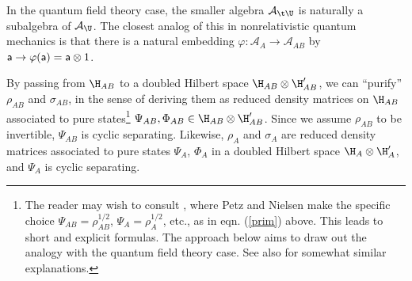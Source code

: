\documentclass[12pt]{article}
\def\a{{\sf a}}
\numberwithin{equation}{section}
\def\A{{\mathcal A}}
\begin{document}
In the quantum field theory case, the smaller algebra 
$\A_{\t\U}$ is naturally a subalgebra of $\A_\U$.  The closest analog of this in nonrelativistic quantum mechanics is that
there is a natural embedding $\varphi:\A_A\to \A_{AB}$ by $\a\to \varphi(\a)= \a\otimes 1$.   

By passing from $\H_{AB}$ to a doubled Hilbert space $\H_{AB}\otimes \H'_{AB}$, we can ``purify'' $\rho_{AB}$ and $\sigma_{AB}$,
in the sense of deriving them as reduced density matrices on $\H_{AB}$ associated to pure states\footnote{The reader may wish to consult \cite{PetzNielsen}, where
Petz and Nielsen
make the specific choice $\Psi_{AB}=\rho_{AB}^{1/2}$, $\Psi_A=\rho_A^{1/2}$, etc., as in eqn. (\ref{prim}) above. This  leads to short and explicit
formulas.  The approach below aims to draw out the analogy with the quantum field theory case.  See also  \cite{NT,GR} for somewhat similar explanations.} 
$\Psi_{AB},\Phi_{AB}\in \H_{AB}\otimes \H'_{AB}$.
Since we assume $\rho_{AB}$ to be invertible, $\Psi_{AB}$ is cyclic separating.  Likewise, $\rho_A$ and $\sigma_A$ are reduced
density matrices associated to pure states $\Psi_A$, $\Phi_A$ in a doubled Hilbert space $\H_A\otimes \H'_A$, and $\Psi_A$ is
cyclic separating.
\end{document}
